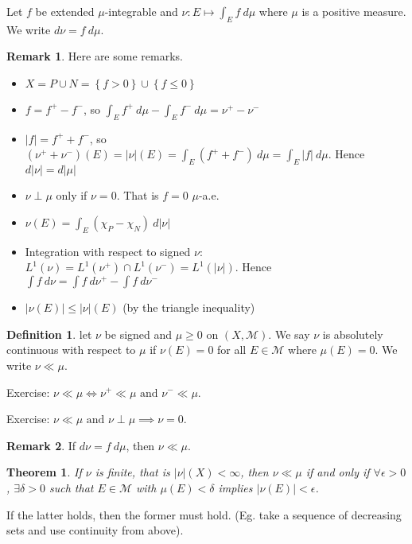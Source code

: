 \documentclass[11pt]{article}
\newtheorem{thm}{Theorem}[section]
\theoremstyle{definition}
\newtheorem{defn}{Definition}[section]
\newtheorem{remark}{Remark}[section]
\newcommand{\set}[1]{\left\{ #1 \right\}}
\newcommand{\abs}[1]{\left\lvert#1\right\rvert} %
\newcommand{\m}[1]{\mathcal{#1}}
\begin{document}
Let $f$ be extended $\mu$-integrable and $\nu:E\mapsto\int_Ef~d\mu$ where $\mu$ is a
positive measure. We write $d\nu=f~d\mu$. 
\begin{remark} Here are some remarks. 
  \begin{itemize}
    \item $X = P\cup N = \set{f>0}\cup\set{f\le0}$ 
    \item $f=f^+-f^-$, so $\int_Ef^+~d\mu-\int_Ef^-~d\mu=\nu^+-\nu^-$
    \item $\abs{f}=f^++f^-$, so
    $(\nu^++\nu^-)(E)=\abs{\nu}(E)=\int_E(f^++f^-)~d\mu=\int_E\abs{f}~d\mu$. Hence
    $d\abs{\nu}=d\abs{\mu}$
    \item $\nu\perp\mu$ only if $\nu=0$. That is $f=0$ $\mu$-a.e.
    \item $\nu(E)=\int_E(\chi_P-\chi_N)~d\abs{\nu}$ 
    \item Integration with respect to signed $\nu$: $L^1(\nu)=L^1(\nu^+)\cap L^1(\nu^-) =
    L^1(\abs{\nu})$. Hence $\int f~d\nu = \int f~d\nu^+ - \int f~d\nu^-$
    \item $\abs{\nu(E)}\le\abs{\nu}(E)$ (by the triangle inequality)
  \end{itemize}
\end{remark}

\begin{defn}
  let $\nu$ be signed and $\mu\ge0$ on $(X,\m{M})$. We say $\nu$ is absolutely continuous
  with respect to $\mu$ if $\nu(E)=0$ for all $E\in\m{M}$ where $\mu(E)=0$. We write
  $\nu\ll\mu$. 
\end{defn}

{\color{red}
Exercise: $\nu\ll\mu \iff \nu^+\ll\mu \text{ and } \nu^-\ll\mu$. 

Exercise: $\nu\ll\mu \text{ and } \nu\perp\mu \implies \nu=0$. 
}

\begin{remark}
  If $d\nu=f~d\mu$, then $\nu\ll\mu$. 
\end{remark}

\begin{thm}
  If $\nu$ is finite, that is $\abs{\nu}(X)<\infty$, then $\nu\ll\mu$ if and only if
  $\forall\epsilon>0$, $\exists\delta>0$ such that $E\in\m{M}$ with $\mu(E)<\delta$
  implies $\abs{\nu(E)}<\epsilon$.
\end{thm}

\proof
If the latter holds, then the former must hold. (Eg. take a sequence of decreasing sets and
use continuity from above). 
\end{document}
